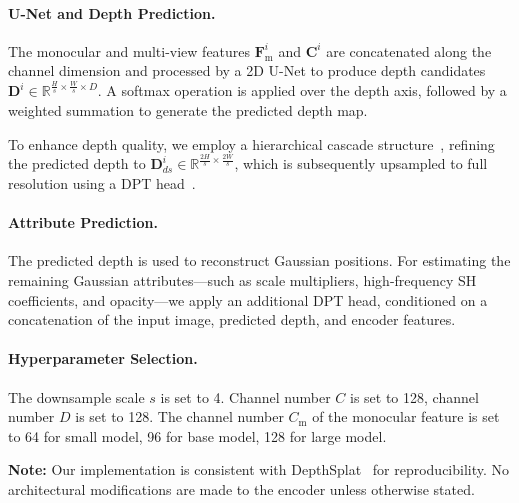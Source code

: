 \paragraph{U-Net and Depth Prediction.}
The monocular and multi-view features \(\boldsymbol{F}_\text{m}^i\) and \(\boldsymbol{C}^i\) are concatenated along the channel dimension and processed by a 2D U-Net to produce depth candidates \(\boldsymbol{D}^i \in \mathbb{R}^{\frac{H}{s} \times \frac{W}{s} \times D}\). A softmax operation is applied over the depth axis, followed by a weighted summation to generate the predicted depth map.

To enhance depth quality, we employ a hierarchical cascade structure~\cite{gu2020cascade}, refining the predicted depth to \(\boldsymbol{D}_{ds}^i \in \mathbb{R}^{\frac{2H}{s} \times \frac{2W}{s}}\), which is subsequently upsampled to full resolution using a DPT head~\cite{ranftl2021vision}.

\paragraph{Attribute Prediction.}
The predicted depth is used to reconstruct Gaussian positions. For estimating the remaining Gaussian attributes—such as scale multipliers, high-frequency SH coefficients, and opacity—we apply an additional DPT head, conditioned on a concatenation of the input image, predicted depth, and encoder features.

\paragraph{Hyperparameter Selection.}
The downsample scale $s$ is set to 4. Channel number $C$ is set to 128, channel number $D$ is set to 128. The channel number $C_\text{m}$ of the monocular feature is set to 64 for small model, 96 for base model, 128 for large model.


\vspace{0.5em}
\noindent\textbf{Note:} Our implementation is consistent with DepthSplat~\cite{xu2024depthsplat} for reproducibility. No architectural modifications are made to the encoder unless otherwise stated.


